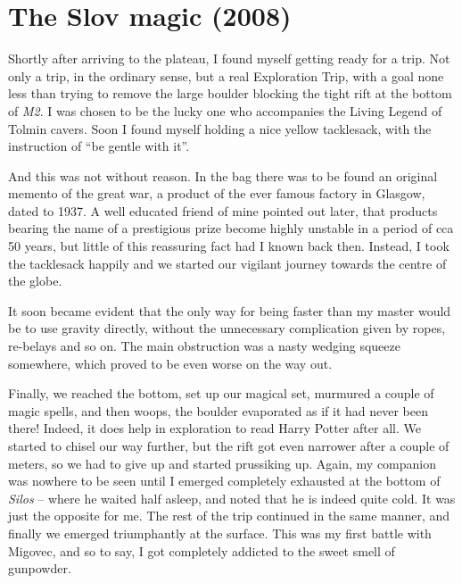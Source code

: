 
\hypertarget{the-slov-magic-2008}{%
\section{The Slov magic (2008)}\label{the-slov-magic-2008}}

Shortly after arriving to the plateau, I found myself getting ready for
a trip. Not only a trip, in the ordinary sense, but a real Exploration
Trip, with a goal none less than trying to remove the large boulder
blocking the tight rift at the bottom of \emph{M2}. I was chosen to be
the lucky one who accompanies the Living Legend of Tolmin cavers. Soon I
found myself holding a nice yellow tacklesack, with the instruction of
``be gentle with it''.

And this was not without reason. In the bag there was to be found an
original memento of the great war, a product of the ever famous factory
in Glasgow, dated to 1937. A well educated friend of mine pointed out
later, that products bearing the name of a prestigious prize become
highly unstable in a period of cca 50 years, but little of this
reassuring fact had I known back then. Instead, I took the tacklesack
happily and we started our vigilant journey towards the centre of the
globe.

It soon became evident that the only way for being faster than my master
would be to use gravity directly, without the unnecessary complication
given by ropes, re-belays and so on. The main obstruction was a nasty
wedging squeeze somewhere, which proved to be even worse on the way out.

Finally, we reached the bottom, set up our magical set, murmured a
couple of magic spells, and then woops, the boulder evaporated as if it
had never been there! Indeed, it does help in exploration to read Harry
Potter after all. We started to chisel our way further, but the rift got
even narrower after a couple of meters, so we had to give up and started
prussiking up. Again, my companion was nowhere to be seen until I
emerged completely exhausted at the bottom of \emph{Silos} -- where he
waited half asleep, and noted that he is indeed quite cold. It was just
the opposite for me. The rest of the trip continued in the same manner,
and finally we emerged triumphantly at the surface. This was my first
battle with Migovec, and so to say, I got completely addicted to the
sweet smell of gunpowder.


